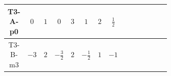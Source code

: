 \documentclass[8pt]{article}
\begin{document}
\begin{landscape}
\begin{longtable}{@{}cccccccc >{\raggedright\arraybackslash}p{0.21\linewidth} >{\raggedright\arraybackslash}p{0.21\linewidth} >{\raggedright\arraybackslash}p{0.21\linewidth}@{}}
\midrule
T3-A-p0 & $0$ & $1$ & $0$ & $3$ & $1$ & $2$ & $\frac{1}{2}$ & \scriptsize\adjustbox{max width=\linewidth}{$\begin{gathered} -S_1 S_1{}^{\dagger } m_1^2 \\ +\frac{1}{2} S_1^2 \left(S_1{}^{\dagger }\right){}^2 \lambda_{S_1}^{(1)}^{(1)}\end{gathered}$} & \scriptsize\adjustbox{max width=\linewidth}{$\begin{gathered} +D_{\mu _1}\left(S_1\right){}^{\dagger } D_{\mu _1}\left(S_1\right)\end{gathered}$} & \scriptsize\adjustbox{max width=\linewidth}{$\begin{gathered} -m_2^2 S_{2,j_1} S_{2,j_1}{}^{\dagger } \\ +\frac{1}{2} S_{2,j_3} S_{2,j_4} S_{2,j_1}{}^{\dagger } S_{2,j_2}{}^{\dagger } \mathcal{I}_{S_2,j_1,j_3,j_2,j_4}{}^1 \lambda_{S_2}^{(1)}^{(1)} \\ +\frac{1}{2} S_{2,j_3} S_{2,j_4} S_{2,j_1}{}^{\dagger } S_{2,j_2}{}^{\dagger } \mathcal{I}_{S_2,j_1,j_3,j_2,j_4}{}^2 \lambda_{S_2}^{(1)}^{(2)}\end{gathered}$} \\
\midrule
T3-B-m3 & $-3$ & $2$ & $-\frac{3}{2}$ & $2$ & $-\frac{1}{2}$ & $1$ & $-1$ & \scriptsize\adjustbox{max width=\linewidth}{$\begin{gathered} -S_{1,j_1} S_{1,j_1}{}^{\dagger } m_1^2 \\ +\frac{1}{2} S_{1,j_3} S_{1,j_4} S_{1,j_1}{}^{\dagger } S_{1,j_2}{}^{\dagger } \mathcal{I}_{S_1,j_1,j_3,j_2,j_4}{}^1 \lambda_{S_1}^{(1)}^{(1)}\end{gathered}$} & \scriptsize\adjustbox{max width=\linewidth}{$\begin{gathered} +D_{\mu _1}\left(S_{1,j_1}\right){}^{\dagger } D_{\mu _1}\left(S_{1,j_1}\right)\end{gathered}$} & \scriptsize\adjustbox{max width=\linewidth}{$\begin{gathered} -m_2^2 S_{2,j_1} S_{2,j_1}{}^{\dagger } \\ +\frac{1}{2} S_{2,j_3} S_{2,j_4} S_{2,j_1}{}^{\dagger } S_{2,j_2}{}^{\dagger } \mathcal{I}_{S_2,j_1,j_3,j_2,j_4}{}^1 \lambda_{S_2}^{(1)}^{(1)}\end{gathered}$} \\
\midrule

\end{longtable}
\end{landscape}
\end{document}
